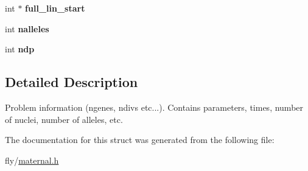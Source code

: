 \begin{DoxyCompactItemize}
\item 
\hypertarget{structZygote_a92b3cc371bcde9a571eaac43f74fa60b}{
int $\ast$ {\bfseries full\_\-lin\_\-start}}
\label{structZygote_a92b3cc371bcde9a571eaac43f74fa60b}

\item 
\hypertarget{structZygote_a35678cb60e1c3ad0c4efd99fb52c73d9}{
int {\bfseries nalleles}}
\label{structZygote_a35678cb60e1c3ad0c4efd99fb52c73d9}

\item 
\hypertarget{structZygote_a559a0a7cdb65dabb9aaf283572fd3468}{
int {\bfseries ndp}}
\label{structZygote_a559a0a7cdb65dabb9aaf283572fd3468}

\end{DoxyCompactItemize}


\subsection{Detailed Description}
Problem information (ngenes, ndivs etc...). Contains parameters, times, number of nuclei, number of alleles, etc. 

The documentation for this struct was generated from the following file:\begin{DoxyCompactItemize}
\item 
fly/\hyperlink{maternal_8h}{maternal.h}\end{DoxyCompactItemize}
